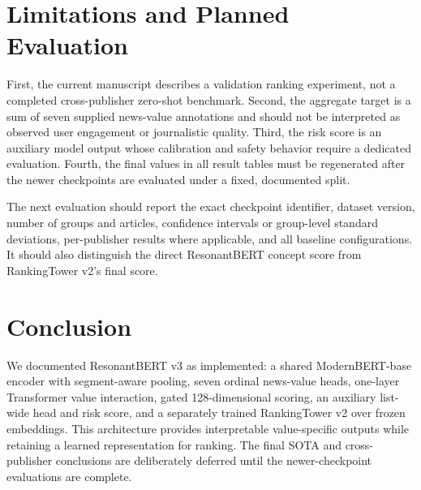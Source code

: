 \documentclass[11pt]{article}
\begin{document}
\section{Limitations and Planned Evaluation}

First, the current manuscript describes a validation ranking experiment, not a completed cross-publisher zero-shot benchmark. Second, the aggregate target is a sum of seven supplied news-value annotations and should not be interpreted as observed user engagement or journalistic quality. Third, the risk score is an auxiliary model output whose calibration and safety behavior require a dedicated evaluation. Fourth, the final values in all result tables must be regenerated after the newer checkpoints are evaluated under a fixed, documented split.

The next evaluation should report the exact checkpoint identifier, dataset version, number of groups and articles, confidence intervals or group-level standard deviations, per-publisher results where applicable, and all baseline configurations. It should also distinguish the direct ResonantBERT concept score from RankingTower v2's final score.

\section{Conclusion}

We documented ResonantBERT v3 as implemented: a shared ModernBERT-base encoder with segment-aware pooling, seven ordinal news-value heads, one-layer Transformer value interaction, gated 128-dimensional scoring, an auxiliary list-wide head and risk score, and a separately trained RankingTower v2 over frozen embeddings. This architecture provides interpretable value-specific outputs while retaining a learned representation for ranking. The final SOTA and cross-publisher conclusions are deliberately deferred until the newer-checkpoint evaluations are complete.
\end{document}
